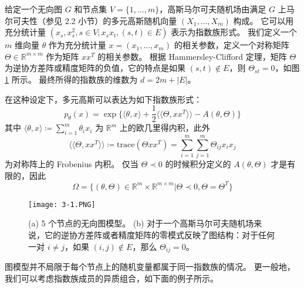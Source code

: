 \begin{tcolorbox}
\begin{exam}[高斯 MRF]

给定一个无向图 $G$ 和节点集 $V = \{1, \dots, m\}$，高斯马尔可夫随机场由满足 $G$ 上马尔可夫性（参见 2.2 小节）的多元高斯随机向量 $(X_1, \dots, X_m)$ 构成。
它可以用充分统计量 $(x_s, x_s^2, s \in V; x_sx_t, (s, t) \in E)$ 表示为指数族形式。
我们定义一个 $m$ 维向量 $\theta$ 作为充分统计量 $x = (x_1, \dots, x_m)$ 的相关参数，定义一个对称矩阵 $\Theta \in \mathbb{R}^{m \times m}$ 作为矩阵 $xx^T$ 的相关参数。
根据 Hammersley-Clifford 定理，矩阵 $\Theta$ 为逆协方差阵或精度矩阵的负值，它的特点是如果 $(s, t) \notin E$，则 $\Theta_{st} = 0$，如图 \ref{fig:3-1} 所示。
最终所得的指数族的维数为 $d = 2m + |E|$。

在这种设定下，多元高斯可以表达为如下指数族形式：
\begin{equation}
    p_{\theta}(x) = \exp{\{\langle \theta, x \rangle + \frac{1}{2}\langle \langle \Theta, xx^T \rangle \rangle - A(\theta, \Theta)\}}
\end{equation}
其中 $\langle \theta, x \rangle \coloneqq \sum_{i = 1}^m\theta_ix_i$ 为 $\mathbb{R}^m$ 上的欧几里得内积，此外
\begin{equation}
    \langle \langle \Theta, xx^T \rangle \rangle \coloneqq \text{trace}(\Theta xx^T) = \sum_{i = 1}^m\sum_{j = 1}^m\Theta_{ij}x_ix_j
\end{equation}
为对称阵上的 Frobenius 内积。
仅当 $\Theta \prec 0$ 的时候积分定义的 $A(\theta, \Theta)$ 才是有限的，因此
\begin{equation}
    \Omega = \{(\theta, \Theta) \in \mathbb{R}^m \times \mathbb{R}^{m \times m}| \Theta \prec 0, \Theta = \Theta^T\}
\end{equation}

\end{exam}
\end{tcolorbox}

\begin{figure}[htbp]
    \centering
    \texttt{[image: 3-1.PNG]}
    \caption{
        (a) 5 个节点的无向图模型。
        (b) 对于一个高斯马尔可夫随机场来说，它的逆协方差阵或者精度矩阵的零模式反映了图结构：对于任何一对 $i \neq j$，如果 $(i, j) \notin E$，那么 $\Theta_{ij} = 0$。
    }\label{fig:3-1}
\end{figure}

图模型并不局限于每个节点上的随机变量都属于同一指数族的情况。
更一般地，我们可以考虑指数族成员的异质组合，如下面的例子所示。

